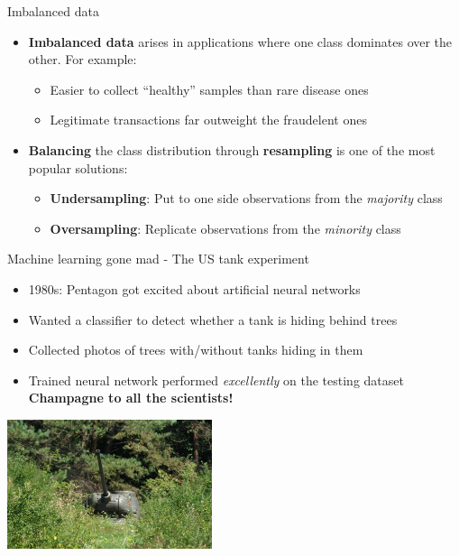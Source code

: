 \documentclass[pdf]{beamer}
\begin{document}
\begin{frame}{Imbalanced data}
\begin{itemize}\addtolength{\itemsep}{3\baselineskip}
	\item<1-> \textbf{Imbalanced data} arises in applications where one class dominates over the other. For example:
	\begin{itemize}\addtolength{\itemsep}{.8\baselineskip}
		\item Easier to collect ``healthy'' samples than rare disease ones
		\item Legitimate transactions far outweight the fraudelent ones
	\end{itemize}
	\item <2-> \textbf{Balancing} the class distribution through \textbf{resampling} is one of the most popular solutions:
	\begin{itemize}\addtolength{\itemsep}{.8\baselineskip}
		\item<3-> \textbf{Undersampling}: Put to one side observations from the \textit{majority} class
		\item<4-> \textbf{Oversampling}: Replicate observations from the \textit{minority} class 
	\end{itemize}
\end{itemize}
\end{frame}

\begin{frame}{Machine learning gone mad - The US tank experiment}
\begin{itemize}\addtolength{\itemsep}{0.5\baselineskip}
	\item<1-> 1980s: Pentagon got excited about artificial neural networks
	\item<2-> Wanted a classifier to detect whether a tank is hiding behind trees
	\item<3-> Collected photos of trees with/without tanks hiding in them
	\item<4-> Trained neural network performed \textit{excellently} on the testing dataset\\
	\textbf{Champagne to all the scientists!}
\end{itemize}
\begin{center}
		\includegraphics[width=0.45\textwidth]{tank.jpg}
\end{center}
\end{frame}
\end{document}
